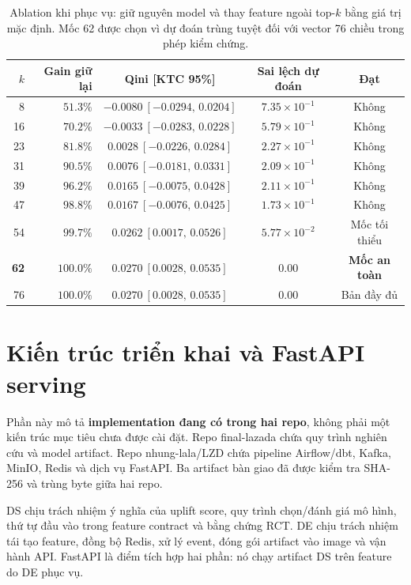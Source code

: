 \documentclass[11pt,a4paper]{article}
\DeclareRobustCommand{\code}[1]{{\small\texttt{#1}}}
\def\code#1{#1}%
\begin{document}
\begin{table}[H]
\centering
\scriptsize
\begin{tabular}{@{}rrccc@{}}
\toprule
$k$ & \textbf{Gain giữ lại} & \textbf{Qini [KTC 95\%]} & \textbf{Sai lệch dự đoán} & \textbf{Đạt} \\
\midrule
8 & $51.3\%$ & $-0.0080\ [-0.0294,\,0.0204]$ & $7.35\times10^{-1}$ & Không \\
16 & $70.2\%$ & $-0.0033\ [-0.0283,\,0.0228]$ & $5.79\times10^{-1}$ & Không \\
23 & $81.8\%$ & $0.0028\ [-0.0226,\,0.0284]$ & $2.27\times10^{-1}$ & Không \\
31 & $90.5\%$ & $0.0076\ [-0.0181,\,0.0331]$ & $2.09\times10^{-1}$ & Không \\
39 & $96.2\%$ & $0.0165\ [-0.0075,\,0.0428]$ & $2.11\times10^{-1}$ & Không \\
47 & $98.8\%$ & $0.0167\ [-0.0076,\,0.0425]$ & $1.73\times10^{-1}$ & Không \\
54 & $99.7\%$ & $0.0262\ [0.0017,\,0.0526]$ & $5.77\times10^{-2}$ & Mốc tối thiểu \\
\textbf{62} & \textbf{$100.0\%$} & \textbf{$0.0270\ [0.0028,\,0.0535]$} & \textbf{$0.00$} & \textbf{Mốc an toàn} \\
76 & $100.0\%$ & $0.0270\ [0.0028,\,0.0535]$ & $0.00$ & Bản đầy đủ \\
\bottomrule
\end{tabular}
\caption{Ablation khi phục vụ: giữ nguyên model và thay feature ngoài top-$k$
bằng giá trị mặc định. Mốc 62 được chọn vì dự đoán trùng tuyệt đối với vector
76 chiều trong phép kiểm chứng.}
\label{tab:serving-ablation}
\end{table}

\section{Kiến trúc triển khai và FastAPI serving}

Phần này mô tả \textbf{implementation đang có trong hai repo}, không phải
một kiến trúc mục tiêu chưa được cài đặt. Repo \code{final-lazada} chứa quy
trình nghiên cứu và model artifact. Repo \code{nhung-lala/LZD} chứa pipeline
Airflow/dbt, Kafka, MinIO, Redis và dịch vụ FastAPI. Ba artifact bàn giao đã
được kiểm tra SHA-256 và trùng byte giữa hai repo.

\begin{summarybox}
DS chịu trách nhiệm ý nghĩa của uplift score, quy trình chọn/đánh giá mô hình,
thứ tự đầu vào trong feature contract và bằng chứng RCT.
DE chịu trách nhiệm tái tạo feature, đồng bộ Redis, xử lý event, đóng gói
artifact vào image và vận hành API. FastAPI là điểm tích hợp hai phần: nó chạy
artifact DS trên feature do DE phục vụ.
\end{summarybox}
\end{document}
